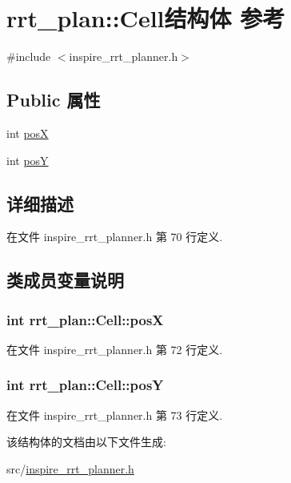 \hypertarget{structrrt__plan_1_1Cell}{\section{rrt\-\_\-plan\-:\-:Cell结构体 参考}
\label{structrrt__plan_1_1Cell}
}


{\ttfamily \#include $<$inspire\-\_\-rrt\-\_\-planner.\-h$>$}

\subsection*{Public 属性}
\begin{DoxyCompactItemize}
\item 
int \hyperlink{structrrt__plan_1_1Cell_a41e05f3b625c736b59db8abcb0ff0d1e}{pos\-X}
\item 
int \hyperlink{structrrt__plan_1_1Cell_afe1da476d8e6a1bff52531e2c6d10be8}{pos\-Y}
\end{DoxyCompactItemize}


\subsection{详细描述}


在文件 inspire\-\_\-rrt\-\_\-planner.\-h 第 70 行定义.



\subsection{类成员变量说明}
\hypertarget{structrrt__plan_1_1Cell_a41e05f3b625c736b59db8abcb0ff0d1e}{
\subsubsection[{pos\-X}]{\setlength{\rightskip}{0pt plus 5cm}int rrt\-\_\-plan\-::\-Cell\-::pos\-X}}\label{structrrt__plan_1_1Cell_a41e05f3b625c736b59db8abcb0ff0d1e}


在文件 inspire\-\_\-rrt\-\_\-planner.\-h 第 72 行定义.

\hypertarget{structrrt__plan_1_1Cell_afe1da476d8e6a1bff52531e2c6d10be8}{
\subsubsection[{pos\-Y}]{\setlength{\rightskip}{0pt plus 5cm}int rrt\-\_\-plan\-::\-Cell\-::pos\-Y}}\label{structrrt__plan_1_1Cell_afe1da476d8e6a1bff52531e2c6d10be8}


在文件 inspire\-\_\-rrt\-\_\-planner.\-h 第 73 行定义.



该结构体的文档由以下文件生成\-:\begin{DoxyCompactItemize}
\item 
src/\hyperlink{inspire__rrt__planner_8h}{inspire\-\_\-rrt\-\_\-planner.\-h}\end{DoxyCompactItemize}
